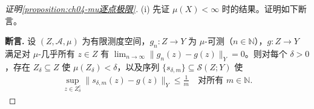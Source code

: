 \documentclass[../../main.tex]{subfiles}%
\begin{document}
\begin{proof}[证明\cref{proposition:ch04-mu逐点极限}]
(i) 先证 $\mu(X)<\infty$ 时的结果。证明如下断言。

\noindent\textbf{断言.} 设 $(Z,\mathcal{A},\mu)$ 为有限测度空间，$g_n:Z\to Y$ 为 $\mu$-可测（$n\in\mathbb{N}$），$g:Z\to Y$ 满足对 $\mu$-几乎所有 $z\in Z$ 有 $\lim_{n\to\infty}\|g_n(z)-g(z)\|_Y=0$。则对每个 $\delta>0$，存在 $Z_\delta\subseteq Z$ 使 $\mu(Z_\delta)<\delta$，以及序列 $\{s_{\delta,m}\}\subseteq\mathcal{S}(Z;Y)$ 使
\begin{align}
\sup_{z\in Z_\delta^c}\|s_{\delta,m}(z)-g(z)\|_Y\leqslant\frac1m\quad\text{对所有 }m\in\mathbb{N}. \label{align:ch04-4.7}
\end{align}


\end{proof}
\end{document}

